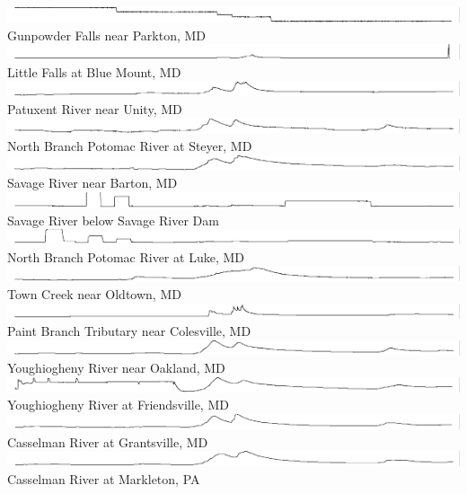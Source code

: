 \documentclass[10pt]{sugconf-ish}
\begin{document}
\includegraphics{stage01581920.pdf}Gunpowder Falls near Parkton, MD\\
\includegraphics{stage01582000.pdf}Little Falls at Blue Mount, MD\\
\includegraphics{stage01591000.pdf}Patuxent River near Unity, MD\\
\includegraphics{stage01595000.pdf}North Branch Potomac River at Steyer, MD\\
\includegraphics{stage01596500.pdf}Savage River near Barton, MD\\
\includegraphics{stage01597500.pdf}Savage River below Savage River Dam \\
\includegraphics{stage01598500.pdf}North Branch Potomac River at Luke, MD\\
\includegraphics{stage01609000.pdf}Town Creek near Oldtown, MD\\
\includegraphics{stage01649150.pdf}Paint Branch Tributary near Colesville, MD\\
\includegraphics{stage03075500.pdf}Youghiogheny River near Oakland, MD\\
\includegraphics{stage03076500.pdf}Youghiogheny River at Friendsville, MD\\
\includegraphics{stage03078000.pdf}Casselman River at Grantsville, MD\\
\includegraphics{stage03079000.pdf}Casselman River at Markleton, PA\\
\end{document}
